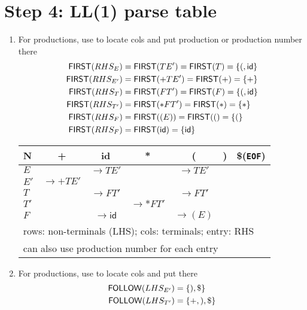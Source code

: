 \section*{Step 4: LL(1) parse table}
\begin{enumerate}
\item For  productions, use  to locate cols and put production or production number there
  \begin{align*}
    \mfn{first}(RHS_{E}) &=\mfn{first}(TE')=\mfn{first}(T) = \mset{(,\mathsf{id}} \\
    \mfn{first}(RHS_{E'})&=\mfn{first}(+TE')=\mfn{first}(+) = \mset{+} \\
    \mfn{first}(RHS_{T}) &=\mfn{first}(FT')=\mfn{first}(F) = \mset{(,\mathsf{id}} \\
    \mfn{first}(RHS_{T'})&=\mfn{first}(*FT')=\mfn{first}(*) = \mset{*} \\
    \mfn{first}(RHS_{F}) &=\mfn{first}((E))= \mfn{first}(() = \mset{(} \\
    \mfn{first}(RHS_{F}) &=\mfn{first}(\mathsf{id}) = \mset{\mathsf{id}}
  \end{align*}
  \begin{tabular}{l|c|c|c|c|c|c}
  \hline
  N       & +          & id  & *          & (           & )   & \$(\texttt{EOF})\\
  \hline
  \(E\)   &            &\(\to TE'\)&& \(\to TE'\) &     & \\
  \(E'\)  &\(\to +TE'\)& &&&\\
  \(T\)   &            &\(\to FT'\)    &            &\(\to FT'\) &\\
  \(T'\)  &            &      &\(\to *FT'\)&&\\
  \(F\)   &            &\(\to \mathsf{id}\)& &\(\to (E)\)&&\\
  \hline
  \multicolumn{7}{l}{rows: non-terminals (LHS); cols: terminals; entry: RHS}\\
  \hline
  \multicolumn{7}{l}{can also use production number for each entry}\\
  \hline
  \end{tabular}
\vspace{.1em}
\item For \mb{$\boldsymbol{\varepsilon}$} productions, use  to locate cols and put \mb{$\boldsymbol{\varepsilon}$} there
  \begin{align*}
    \mfn{follow}(LHS_{E'})&= \mset{), \$}\\
    \mfn{follow}(LHS_{T'})&= \mset{+, ), \$}

\end{align*}
\end{enumerate}
